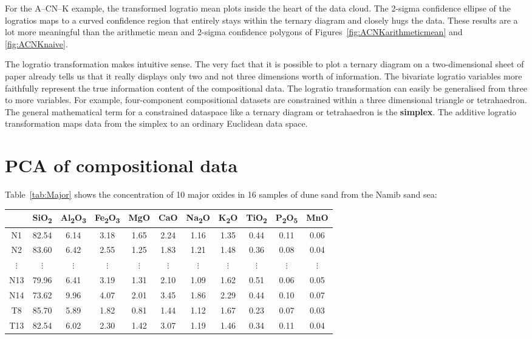 For the A--CN--K example, the transformed logratio mean plots inside
the heart of the data cloud. The 2-sigma confidence ellipse of the
logratios maps to a curved confidence region that entirely stays
within the ternary diagram and closely hugs the data. These results
are a lot more meaningful than the arithmetic mean and 2-sigma
confidence polygons of Figures~\ref{fig:ACNKarithmeticmean} and
\ref{fig:ACNKnaive}.\medskip

The logratio transformation makes intuitive sense. The very fact that
it is possible to plot a ternary diagram on a two-dimensional sheet of
paper already tells us that it really displays only two and not three
dimensions worth of information. The bivariate logratio variables more
faithfully represent the true information content of the compositional
data. The logratio transformation can easily be generalised from three
to more variables. For example, four-component compositional datasets
are constrained within a three dimensional triangle or tetrahaedron.
The general mathematical term for a constrained dataspace like a
ternary diagram or tetrahaedron is the \textbf{simplex}.  The additive
logratio transformation maps data from the simplex to an ordinary
Euclidean data space.

\section{PCA of compositional data}
\label{sec:compositionalPCA}

Table~\ref{tab:Major} shows the concentration of 10 major oxides in 16
samples of dune sand from the Namib sand sea:

\begin{center}
\begin{tabular}{c|cccccccccc}
 & SiO\textsubscript{2} & Al\textsubscript{2}O\textsubscript{3} & 
Fe\textsubscript{2}O\textsubscript{3} & MgO & CaO & Na\textsubscript{2}O & 
K\textsubscript{2}O & TiO\textsubscript{2} & 
P\textsubscript{2}O\textsubscript{5} & MnO\\ \hline
N1 & 82.54 & 6.14 & 3.18 & 1.65 & 2.24 & 1.16 & 1.35 & 0.44 & 0.11 & 0.06\\
N2 & 83.60 & 6.42 & 2.55 & 1.25 & 1.83 & 1.21 & 1.48 & 0.36 & 0.08 & 0.04\\
$\vdots$ & $\vdots$ & $\vdots$ & $\vdots$ & $\vdots$ & $\vdots$ &
$\vdots$ & $\vdots$ & $\vdots$ & $\vdots$ & $\vdots$ \\
N13 & 79.96 & 6.41 & 3.19 & 1.31 & 2.10 & 1.09 & 1.62 & 0.51 & 0.06 & 0.05\\
N14 & 73.62 & 9.96 & 4.07 & 2.01 & 3.45 & 1.86 & 2.29 & 0.44 & 0.10 & 0.07\\
T8 & 85.70 & 5.89 & 1.82 & 0.81 & 1.44 & 1.12 & 1.67 & 0.23 & 0.07 & 0.03\\
T13 & 82.54 & 6.02 & 2.30 & 1.42 & 3.07 & 1.19 & 1.46 & 0.34 & 0.11 & 0.04
\end{tabular}
\label{tab:Major}
\end{center}

